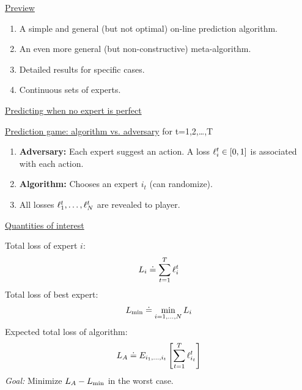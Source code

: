 \begin{flushleft}
\begin{LARGE}
\pagebreak
\begin{center}
\underline{Preview}
\end{center}

\begin{enumerate}
\item A simple and general (but not optimal) on-line prediction
      algorithm.
\item An even more general (but non-constructive) meta-algorithm.
\item Detailed results for specific cases.
\item Continuous sets of experts.
\end{enumerate}

\pagebreak
\begin{center}
\underline{Predicting when no expert is perfect}
\end{center}

\underline{Prediction game: algorithm vs. adversary}
\newline\newline
for t=1,2,\ldots,T
\begin{enumerate}
\item
{\bf Adversary:} Each expert suggest an action. \newline
	   A loss $\ell_{i}^{t} \in [0,1]$ is associated with each action.
\item
{\bf Algorithm:} Chooses an expert $i_t$ (can randomize).
\item
All losses $\ell_{1}^{t},\ldots,\ell_{N}^{t}$ are revealed to player.
\end{enumerate}
\pagebreak
\begin{center}
\underline{Quantities of interest}
\end{center}
Total loss of expert $i$: $$L_{i} \doteq \sum_{t=1}^T \ell_{i}^{t}$$
Total loss of best expert: $$L_{\min} \doteq \min_{i=1,\ldots,N}
L_{i}$$
Expected total loss of algorithm:
$$L_A \doteq E_{i_1,\ldots,i_t} \left[ \sum_{t=1}^T \ell_{i_t}^{t} \right]$$
\newline
{\em Goal:} Minimize $L_A - L_{\min}$ in the worst case.

\pagebreak
	

\end{LARGE}
\end{flushleft}
